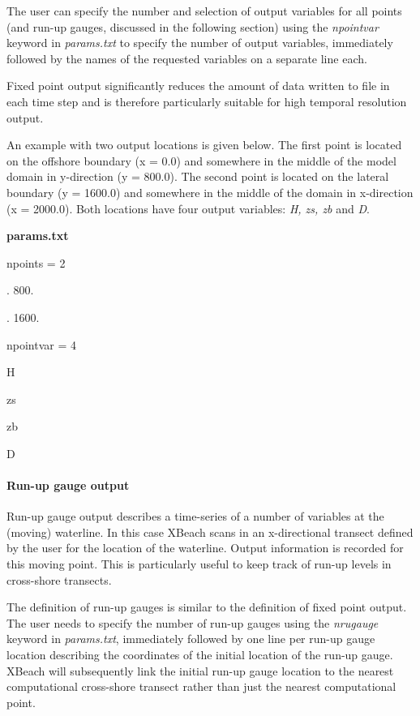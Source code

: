 \documentclass{article}
\begin{document}
\noindent The user can specify the number and selection of output variables for all points (and run-up gauges, discussed in the following section) using the \textit{npointvar} keyword in \textit{params.txt }to specify the number of output variables, immediately followed by the names of the requested variables on a separate line each.

\noindent Fixed point output significantly reduces the amount of data written to file in each time step and is therefore particularly suitable for high temporal resolution output.

\noindent An example with two output locations is given below. The first point is located on the offshore boundary (x = 0.0) and somewhere in the middle of the model domain in y-direction (y = 800.0). The second point is located on the lateral boundary (y = 1600.0) and somewhere in the middle of the domain in x-direction (x = 2000.0). Both locations have four output variables: \textit{H, zs, zb }and\textit{ D}.

\noindent \textbf{params.txt}

\noindent npoints = 2

. 800. 

. 1600. 

\noindent 

\noindent npointvar = 4

\noindent H

\noindent zs

\noindent zb

\noindent D


\paragraph{ Run-up gauge output}

\noindent Run-up gauge output describes a time-series of a number of variables at the (moving) waterline. In this case XBeach scans in an x-directional transect defined by the user for the location of the waterline. Output information is recorded for this moving point. This is particularly useful to keep track of run-up levels in cross-shore transects.

\noindent The definition of run-up gauges is similar to the definition of fixed point output. The user needs to specify the number of run-up gauges using the \textit{nrugauge} keyword in \textit{params.txt}, immediately followed by one line per run-up gauge location describing the coordinates of the initial location of the run-up gauge. XBeach will subsequently link the initial run-up gauge location to the nearest computational cross-shore transect rather than just the nearest computational point.
\end{document}
